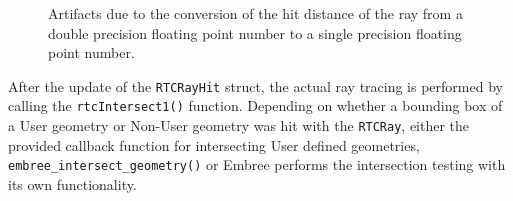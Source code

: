 \begin{figure}[!tbp]
	\centering
	\hfill
	\caption{Artifacts due to the conversion of the hit distance of the ray from a double precision floating point number to a single precision floating point number.}
	\label{fig:offset}
\end{figure}

After the update of the \texttt{RTCRayHit} struct, the actual ray tracing is performed by calling the \texttt{rtcIntersect1()} function. Depending on whether a bounding box of a User geometry or Non-User geometry was hit with the \texttt{RTCRay}, either the provided callback function for intersecting User defined geometries, \texttt{embree\_intersect\_geometry()} or Embree performs the intersection testing with its own functionality. 


